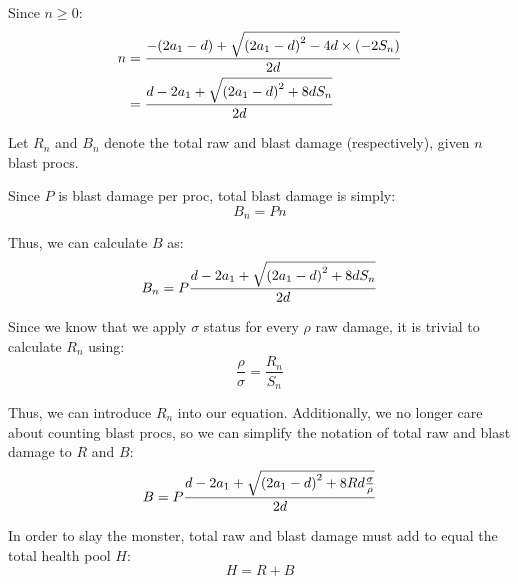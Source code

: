 \documentclass{article}
\begin{document}
Since $n \ge 0$:
\begin{align}
    n &= \frac{- \parens*{2 a_1 - d} + \sqrt{\parens*{2 a_1 - d}^2 - 4 d \times \parens*{- 2 S_n}}}{2 d} \\
      &= \frac{d - 2 a_1 + \sqrt{\parens*{2 a_1 - d}^2 + 8 d S_n}}{2 d}
\end{align}

Let $R_n$ and $B_n$ denote the total raw and blast damage (respectively), given $n$ blast procs.

Since $P$ is blast damage per proc, total blast damage is simply:
\begin{equation}
    B_n = Pn
\end{equation}

Thus, we can calculate $B$ as:
\begin{equation}
    B_n = P \frac{d - 2 a_1 + \sqrt{\parens*{2 a_1 - d}^2 + 8 d S_n}}{2 d}
\end{equation}

Since we know that we apply $\sigma$ status for every $\rho$ raw damage, it is trivial to calculate $R_n$ using:
\begin{equation}
    \frac{\rho}{\sigma} = \frac{R_n}{S_n}
\end{equation}

Thus, we can introduce $R_n$ into our equation. Additionally, we no longer care about counting blast procs, so we can simplify the notation of total raw and blast damage to $R$ and $B$:
\begin{equation}
    B = P \frac{d - 2 a_1 + \sqrt{\parens*{2 a_1 - d}^2 + 8 R d \frac{\sigma}{\rho} }}{2 d}
\end{equation}

In order to slay the monster, total raw and blast damage must add to equal the total health pool $H$:
\begin{equation}
    H = R + B
\end{equation}
\end{document}
